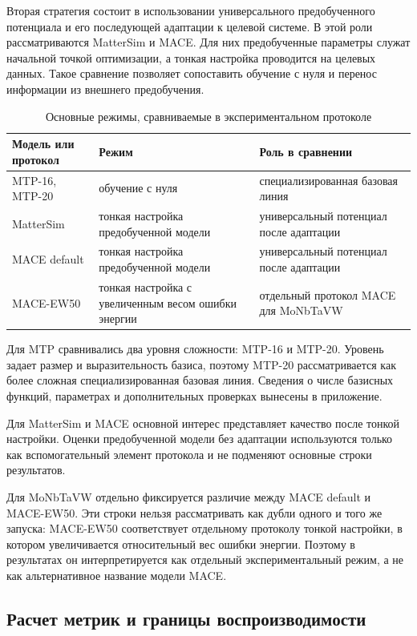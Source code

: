 Вторая стратегия состоит в использовании универсального предобученного потенциала и его последующей адаптации к целевой системе. В этой роли рассматриваются MatterSim и MACE. Для них предобученные параметры служат начальной точкой оптимизации, а тонкая настройка проводится на целевых данных. Такое сравнение позволяет сопоставить обучение с нуля и перенос информации из внешнего предобучения.

\begin{table}[h]
\centering
\small
\caption{Основные режимы, сравниваемые в экспериментальном протоколе}
\label{tab:protocol_training_modes}
\begin{tabularx}{\textwidth}{@{}l>{\raggedright\arraybackslash}X>{\raggedright\arraybackslash}X@{}}
\toprule
Модель или протокол & Режим & Роль в сравнении \\
\midrule
MTP-16, MTP-20 & обучение с нуля & специализированная базовая линия \\
MatterSim & тонкая настройка предобученной модели & универсальный потенциал после адаптации \\
MACE default & тонкая настройка предобученной модели & универсальный потенциал после адаптации \\
MACE-EW50 & тонкая настройка с увеличенным весом ошибки энергии & отдельный протокол MACE для MoNbTaVW \\
\bottomrule
\end{tabularx}
\end{table}

Для MTP сравнивались два уровня сложности: MTP-16 и MTP-20. Уровень задает размер и выразительность базиса, поэтому MTP-20 рассматривается как более сложная специализированная базовая линия. Сведения о числе базисных функций, параметрах и дополнительных проверках вынесены в приложение.

Для MatterSim и MACE основной интерес представляет качество после тонкой настройки. Оценки предобученной модели без адаптации используются только как вспомогательный элемент протокола и не подменяют основные строки результатов.

Для MoNbTaVW отдельно фиксируется различие между MACE default и MACE-EW50. Эти строки нельзя рассматривать как дубли одного и того же запуска: MACE-EW50 соответствует отдельному протоколу тонкой настройки, в котором увеличивается относительный вес ошибки энергии. Поэтому в результатах он интерпретируется как отдельный экспериментальный режим, а не как альтернативное название модели MACE.

\subsection{Расчет метрик и границы воспроизводимости}

